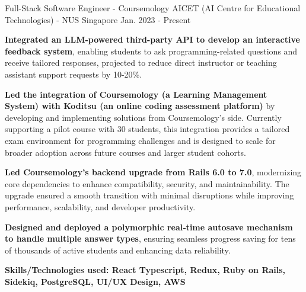 

\begin{cventries}

  \cventry
    {Full-Stack Software Engineer - Coursemology} %
    {AICET (AI Centre for Educational Technologies) - NUS} %
    {Singapore} %
    {Jan. 2023 - Present} %
    {
      \begin{cvitems}
        \item {\textbf{Integrated an LLM-powered third-party API to develop an interactive feedback system}, enabling students to ask programming-related questions and receive tailored responses, projected to reduce direct instructor or teaching assistant support requests by 10-20\%.}
        \item {\textbf{Led the integration of Coursemology (a Learning Management System) with Koditsu (an online coding assessment platform)} by developing and implementing solutions from Coursemology's side. Currently supporting a pilot course with 30 students, this integration provides a tailored exam environment for programming challenges and is designed to scale for broader adoption across future courses and larger student cohorts.}
        \item {\textbf{Led Coursemology's backend upgrade from Rails 6.0 to 7.0}, modernizing core dependencies to enhance compatibility, security, and maintainability. The upgrade ensured a smooth transition with minimal disruptions while improving performance, scalability, and developer productivity.}
        \item {\textbf{Designed and deployed a polymorphic real‑time autosave mechanism to handle multiple answer types}, ensuring seamless progress saving for tens of thousands of active students and enhancing data reliability.}
      \end{cvitems}
    }
    {\textbf{Skills/Technologies used: React Typescript, Redux, Ruby on Rails, Sidekiq, PostgreSQL, UI/UX Design, AWS}}


\end{cventries}
